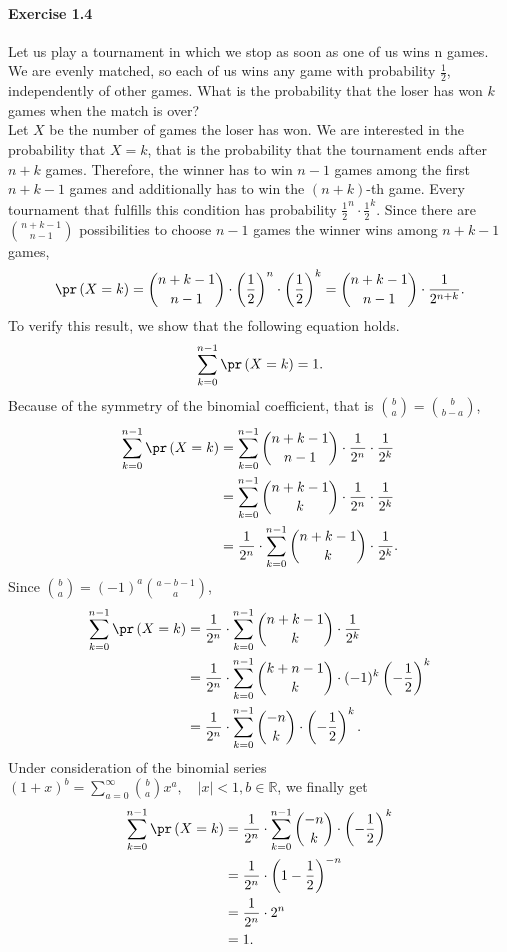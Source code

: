 \paragraph{Exercise 1.4} Let us play a tournament in which we stop as soon as one
of us wins n games. We are evenly matched, so each of us wins any game with
probability $\frac{1}{2}$, independently of other games. What is the probability
that the loser has won $k$ games when the match is over? \\[0.2cm]
Let $X$ be the number of games the loser has won. We are interested in the
probability that $X = k$, that is the probability that the tournament ends after
$n + k$ games. Therefore, the winner has to win $n-1$ games among the first
$n + k - 1$ games and additionally has to win the $(n+k)$-th game. Every tournament
that fulfills this condition has probability $\frac{1}{2}^n \cdot \frac{1}{2}^{k}$.
Since there are $\binom{n+k-1}{n-1}$ possibilities to choose $n-1$ games the winner
wins among $n+k-1$ games,
\[
  \pr\left(X = k\right)
    = \binom{n+k-1}{n-1} \cdot \left(\frac{1}{2}\right)^n \cdot \left(\frac{1}{2}\right)^{k}
    = \binom{n+k-1}{n-1} \cdot \frac{1}{2^{n+k}}.
\]
To verify this result, we show that the following equation holds.
\[
  \sum_{k=0}^{n-1}\pr\left(X=k\right) = 1.
\]
Because of the symmetry of the binomial coefficient, that is $\binom{b}{a} = \binom{b}{b - a}$,
\begin{align*}
  \sum_{k=0}^{n-1}\pr\left(X=k\right)
    &= \sum_{k=0}^{n-1} \binom{n+k-1}{n-1} \cdot \frac{1}{2^n} \cdot \frac{1}{2^k} \\
    &= \sum_{k=0}^{n-1} \binom{n+k-1}{k} \cdot \frac{1}{2^n} \cdot \frac{1}{2^k} \\
    &= \frac{1}{2^n} \cdot \sum_{k=0}^{n-1} \binom{n+k-1}{k} \cdot \frac{1}{2^k}.
\end{align*}
Since $\binom{b}{a} = (-1)^a \binom{a - b - 1}{a}$,
\begin{align*}
  \sum_{k=0}^{n-1}\pr\left(X=k\right)
    &= \frac{1}{2^n} \cdot \sum_{k=0}^{n-1} \binom{n+k-1}{k} \cdot \frac{1}{2^k} \\
    &= \frac{1}{2^n} \cdot \sum_{k=0}^{n-1} \binom{k+n-1}{k} \cdot (-1)^k \left(- \frac{1}{2}\right)^{k} \\
    &= \frac{1}{2^n} \cdot \sum_{k=0}^{n-1} \binom{-n}{k} \cdot \left(- \frac{1}{2}\right)^{k}.
\end{align*}
Under consideration of the binomial series $(1 + x)^b = \sum_{a=0}^{\infty}
\binom{b}{a}x^a, \quad |x| < 1, b \in \mathbb{R}$, we finally get
\begin{align*}
  \sum_{k=0}^{n-1}\pr\left(X=k\right)
    &= \frac{1}{2^n} \cdot \sum_{k=0}^{n-1} \binom{-n}{k} \cdot \left(- \frac{1}{2}\right)^{k} \\
    &= \frac{1}{2^n} \cdot \left(1 - \frac{1}{2}\right)^{-n} \\
    &= \frac{1}{2^n} \cdot 2^n \\
    &= 1.
\end{align*}

